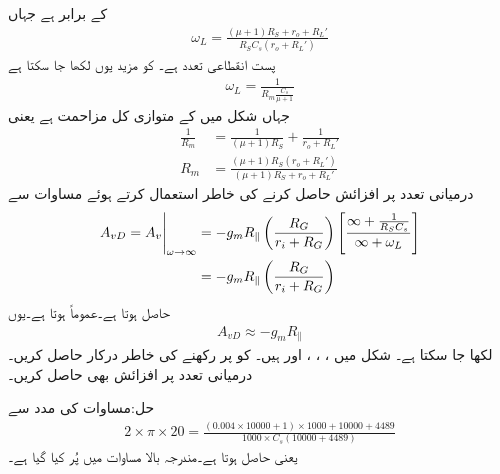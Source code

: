 کے برابر ہے جہاں
\begin{align}\label{مساوات_تعددی_ردعمل_ماسفیٹ_مخارج_کپیسٹر}
\omega_L=\frac{\left(\mu+1 \right)R_S +r_o +R_L'}{R_S C_s \left(r_o +R_L'\right)}
\end{align}
پست انقطاعی تعدد ہے۔ کو مزید یوں لکھا جا سکتا ہے
\begin{align}
\omega_L=\frac{1}{R_m \frac{C_s}{\mu+1}}
\end{align}
جہاں  شکل  میں  کے متوازی کل مزاحمت ہے یعنی
\begin{align*}
\frac{1}{R_m}&=\frac{1}{\left(\mu+1 \right) R_S}+\frac{1}{r_o+R_L'}\\
R_m&=\frac{\left(\mu+1 \right) R_S \left(r_o+R_L' \right)}{\left(\mu+1 \right)R_S+r_o+R_L'}
\end{align*}
درمیانی تعدد پر افزائش حاصل کرنے کی خاطر  استعمال کرتے ہوئے مساوات   سے
\begin{align*}
A_{vD}=\eval{A_v}_{\omega \to \infty}&=-g_m R_{\mathbin{\|}}\left(\frac{R_G}{r_i+R_G} \right)\left[\frac{\infty+\frac{1}{ R_S C_s}}{\infty+\omega_L}\right] \\
&=-g_m R_{\mathbin{\|}}\left(\frac{R_G}{r_i+R_G} \right)
\end{align*}
حاصل ہوتا ہے۔عموماً  ہوتا ہے۔یوں
\begin{align}\label{مساوات_تعدد_ردعمل_درمیانی_تعدد_پر_افزائش_ماسفیٹ_مخارج_کپیسٹر}
A_{vD} \approx -g_m R_{\mathbin{\|}}
\end{align}
لکھا جا سکتا ہے۔
شکل  میں ، ، ،  اور  ہیں۔ کو  پر رکھنے کی خاطر درکار  حاصل کریں۔درمیانی تعدد پر افزائش  بھی حاصل کریں۔

حل:مساوات  کی مدد سے
\begin{align*}
2 \times \pi \times 20=\frac{\left(0.004 \times 10000+1 \right)\times 1000 +10000 +4489}{1000\times C_s \left(10000 +4489\right)}
\end{align*}
یعنی  حاصل ہوتا ہے۔مندرجہ بالا مساوات میں  پُر کیا گیا ہے۔

